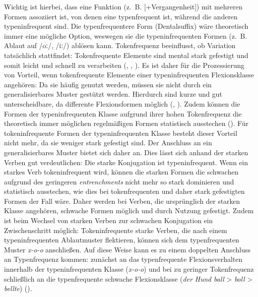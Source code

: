  
Wichtig ist hierbei, dass eine Funktion (z.~B. [+Vergangenheit]) mit mehreren Formen assoziiert ist, von denen eine typenfrequent ist, während die anderen typeninfrequent sind. Die typenfrequentere Form (Dentalsuffix) wäre theoretisch immer eine mögliche Option, weswegen sie die typeninfrequenten Formen (z.~B. Ablaut auf /oː/, /iː/) ablösen kann. Tokenfrequenz beeinflusst, ob Variation tatsächlich stattfindet: Tokenfrequente Elemente sind mental stark gefestigt und somit leicht und schnell zu verarbeiten (\cite{Rubenstein.1970}, \cite[380]{Bybee.1997}, \cite[13]{Schneider.2014}). Es ist daher für die Prozessierung von Vorteil, wenn tokenfrequente Elemente einer typeninfrequenten Flexionsklasse angehören: Da sie häufig genutzt werden, müssen sie nicht durch ein generalisierbares Muster gestützt werden. Hierdurch sind kurze und  gut unterscheidbare, da differente Flexionsformen möglich (\cite[42--43]{Werner.1989}, \cite[226--227]{Nubling.2000}). Zudem können die Formen der typeninfrequenten Klasse aufgrund ihrer hohen Tokenfrequenz  die theoretisch immer möglichen regelmäßigen Formen statistisch ausstechen (\cite[83--84]{Goldberg.2019}). Für tokeninfrequente Formen der typeninfrequenten Klasse besteht dieser Vorteil nicht mehr, da sie weniger stark gefestigt sind. Der Anschluss an ein generalisierbares Muster bietet sich daher an. Dies lässt sich anhand der starken Verben gut verdeutlichen: Die starke Konjugation ist typeninfrequent. Wenn ein starkes Verb tokeninfrequent wird, können die starken Formen die schwachen aufgrund des geringeren \textit{entrenchments} nicht mehr so stark dominieren und statistisch ausstechen, wie dies bei tokenfrequenten und daher stark gefestigten Formen der Fall wäre. Daher werden bei Verben, die ursprünglich der starken Klasse angehören, schwache Formen möglich und durch Nutzung gefestigt. Zudem ist beim Wechsel von starken Verben zur schwachen Konjugation ein Zwischenschritt möglich: Tokeninfrequente starke Verben, die nach einem typeninfrequenten Ablautmuster flektieren, können sich dem typenfrequenten Muster \textit{x-o-o} anschließen. Auf diese Weise kann es zu einem doppelten Anschluss an Typenfrequenz kommen: zunächst an das typenfrequente Flexionsverhalten innerhalb der typeninfrequenten Klasse (\textit{x-o-o}) und bei zu geringer Tokenfrequenz schließlich an die typenfrequente schwache Flexionsklasse (\textit{der Hund ball} > \textit{boll} > \textit{bellte}) (\cite[178--183]{Nowak.2013}). 


